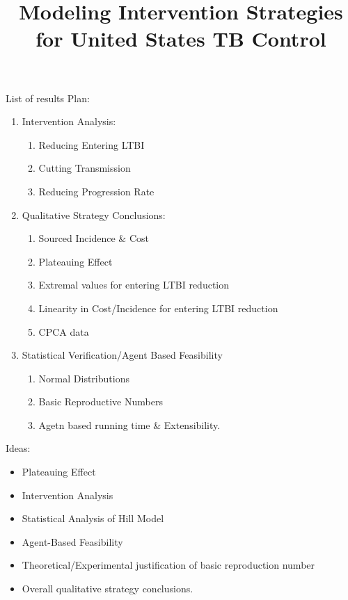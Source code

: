 \documentclass{amsart}
\title{Modeling Intervention Strategies for United States TB Control}
\begin{document}
\maketitle

{\huge \color{red} List of results}
Plan:
\begin{enumerate}
  \item Intervention Analysis: 
    \begin{enumerate}
      \item Reducing Entering LTBI
      \item Cutting Transmission
      \item Reducing Progression Rate
    \end{enumerate}
  \item Qualitative Strategy Conclusions:
    \begin{enumerate}
      \item Sourced Incidence \& Cost
      \item Plateauing Effect
      \item Extremal values for entering LTBI reduction
      \item Linearity in Cost/Incidence for entering LTBI reduction
      \item CPCA data
    \end{enumerate}
  \item Statistical Verification/Agent Based Feasibility
    \begin{enumerate}
      \item Normal Distributions
      \item Basic Reproductive Numbers
      \item Agetn based running time \& Extensibility. 
    \end{enumerate}
\end{enumerate}
Ideas:
\begin{itemize}
  \item Plateauing Effect
  \item Intervention Analysis
  \item Statistical Analysis of Hill Model
  \item Agent-Based Feasibility
  \item Theoretical/Experimental justification of basic reproduction number
  \item Overall qualitative strategy conclusions. 
\end{itemize}
\end{document}
